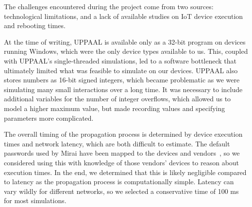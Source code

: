 The challenges encountered during the project come from two sources: technological limitations, and a lack of available studies on IoT device execution and rebooting times.~\par

At the time of writing, UPPAAL is available only as a 32-bit program on devices running Windows, which were the only device types available to us. This, coupled with UPPAAL's single-threaded simulations, led to a software bottleneck that ultimately limited what was feasible to simulate on our devices. UPPAAL also stores numbers as 16-bit signed integers, which became problematic as we were simulating many small interactions over a long time. It was necessary to include additional variables for the number of integer overflows, which allowed us to model a higher maximum value, but made recording values and specifying parameters more complicated.
\par

The overall timing of the propagation process is determined by device execution times and network latency, which are both difficult to estimate. The default passwords used by Mirai have been mapped to the devices and vendors~\cite{Antonakakis2017_USENIX_Mirai_First_Study}, so we considered using this with knowledge of those vendors' devices to reason about execution times. In the end, we determined that this is likely negligible compared to latency as the propagation process is computationally simple. Latency can vary wildly for different networks, so we selected a conservative time of 100 ms for most simulations.

